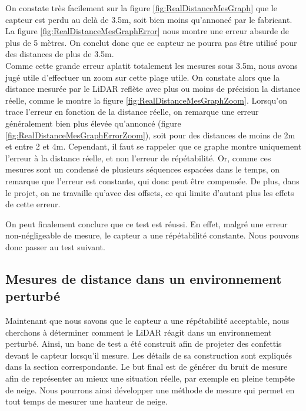 On constate très facilement sur la figure \ref{fig:RealDistanceMesGraph} que le capteur est perdu au delà
de 3.5m, soit bien moins qu'annoncé par le fabricant. La figure \ref{fig:RealDistanceMesGraphError} nous 
montre une erreur absurde de plus de 5 mètres. On conclut donc que ce capteur ne pourra pas être utilisé
pour des distances de plus de 3.5m.\\
Comme cette grande erreur aplatit totalement les mesures sous 3.5m, nous avons jugé utile d'effectuer un
zoom sur cette plage utile. On constate alors que la distance mesurée par le LiDAR reflète avec plus ou
moins de précision la distance réelle, comme le montre la figure \ref{fig:RealDistanceMesGraphZoom}.
Lorsqu'on trace l'erreur en fonction de la distance réelle, on remarque une erreur généralement bien plus
élevée qu'annoncé (figure \ref{fig:RealDistanceMesGraphErrorZoom}), soit \textpm 1cm pour des distances de 
moins de 2m et \textpm 2cm entre 2 et 4m. Cependant, il faut se rappeler que ce graphe montre uniquement 
l'erreur à la distance réelle, et non l'erreur de répétabilité. Or, comme ces mesures sont un condensé 
de plusieurs séquences espacées dans le temps, on remarque que l'erreur est constante, qui donc peut 
être compensée. De plus, dans le projet, on ne travaille qu'avec des offsets, ce qui limite d'autant 
plus les effets de cette erreur.\par

On peut finalement conclure que ce test est réussi. En effet, malgré une erreur non-négligeable de mesure,
le capteur a une répétabilité constante. Nous pouvons donc passer au test suivant.

\subsection{Mesures de distance dans un environnement perturbé}
\label{fig:MesNoise}

Maintenant que nous savons que le capteur a une répétabilité acceptable, nous cherchons à déterminer comment 
le LiDAR réagit dans un environnement perturbé. Ainsi, un banc de test a été construit afin de projeter 
des confettis devant le capteur lorsqu'il mesure. Les détails de sa construction sont expliqués dans la
section correspondante. Le but final est de générer du bruit de mesure afin de représenter au mieux une
situation réelle, par exemple en pleine tempête de neige. Nous pourrons ainsi développer une méthode
de mesure qui permet en tout temps de mesurer une hauteur de neige.

